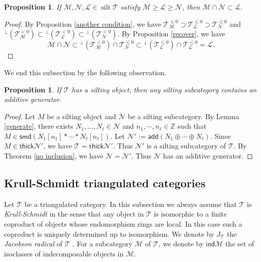\documentclass[a4paper,reqno]{amsart}
\newtheorem{proposition}[theorem]{Proposition}
\theoremstyle{definition}
\newcommand{\TT}{{\mathcal T}}
\newcommand{\MM}{{\mathcal M}}
\newcommand{\NN}{{\mathcal N}}
\newcommand{\LL}{{\mathcal L}}
\newcommand{\Z}{\mathbb{Z}}
\newcommand{\ind}{\mathsf{ind}}
\newcommand{\add}{\mathsf{add}}
\newcommand{\summand}{\mathsf{smd}}
\newcommand{\thick}{\mathsf{thick}}
\newcommand{\silt}{\operatorname{silt}\nolimits}
\begin{document}
\begin{proposition}\label{common summand}
If $\MM,\NN,\LL\in\silt\TT$ satisfy
$\MM\ge\LL\ge\NN$, then $\MM\cap\NN\subset\LL$.
\end{proposition}

\begin{proof}
By Proposition \ref{another condition}, we have $\TT_{\MM}^{\le0}\supset\TT_{\LL}^{\le0}\supset\TT_{\NN}^{\le0}$ and
${}^\perp(\TT_{\MM}^{<0})\subset{}^\perp(\TT_{\LL}^{<0})\subset{}^\perp(\TT_{\NN}^{<0})$.
By Proposition \ref{recover}, we have
\[\MM\cap\NN\subset{}^\perp(\TT_{\MM}^{\le0})\cap\TT_{\NN}^{\le0}
\subset{}^\perp(\TT_{\LL}^{\le0})\cap\TT_{\LL}^{\le0}=\LL.\]
\end{proof}

We end this subsection by the following observation.

\begin{proposition}\label{existence of additive generator}
If $\TT$ has a silting object, then any silting subcategory contains an additive generator.
\end{proposition}

\begin{proof}
Let $M$ be a silting object and $\NN$ be a silting subcategory.
By Lemma \ref{generate}, there exists $N_1,\ldots,N_\ell\in\NN$ and $n_1,\cdots,n_\ell\in\Z$ such that $M\in\summand(N_1[n_1]*\cdots*N_\ell[n_\ell])$.
Let $\NN':=\add(N_1\oplus\cdots\oplus N_\ell)$.
Since $M\in\thick\NN'$, we have $\TT=\thick\NN'$.
Thus $\NN'$ is a silting subcategory of $\TT$.
By Theorem \ref{no inclusion}, we have $\NN=\NN'$.
Thus $\NN$ has an additive generator.
\end{proof}


\subsection{Krull-Schmidt triangulated categories}

Let $\TT$ be a triangulated category.
In this subsection we always assume that $\TT$ is \emph{Krull-Schmidt}
in the sense that any object in $\TT$ is isomorphic to a finite coproduct
of objects whose endomorphism rings are local.
In this case such a coproduct is uniquely determined up to isomorphism.
We denote by $J_{\TT}$ the \emph{Jacobson radical} of $\TT$ \cite{ARS,ASS}.
For a subcategory $\MM$ of $\TT$, we denote by $\ind\MM$ the set
of isoclasses of indecomposable objects in $\MM$.
\end{document}
